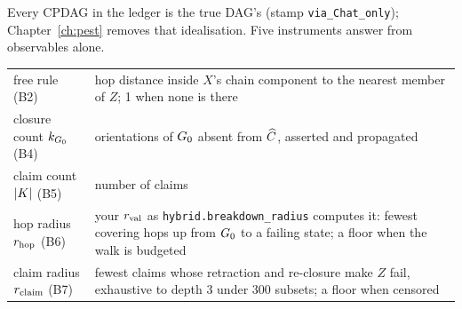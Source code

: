 Every CPDAG in the ledger is the true DAG's (stamp \texttt{via\_Chat\_only}); Chapter~\ref{ch:pest}
removes that idealisation. Five instruments answer from observables alone.

\begin{center}\small
\begin{tabular}{@{}p{3.75cm}p{11.75cm}@{}}
\toprule
free rule (B2) & hop distance inside $X$'s chain component to the nearest member of $Z$; 1 when none
is there \\
closure count $k_{G_0}$ (B4) & orientations of $G_0$ absent from $\widehat{C}$, asserted and propagated \\
claim count $|K|$ (B5) & number of claims \\
hop radius $r_{\mathrm{hop}}$ (B6) & your $r_{\mathrm{val}}$ as \texttt{hybrid.breakdown\_radius} computes it: fewest covering
hops up from $G_0$ to a failing state; a floor when the walk is budgeted \\
claim radius $r_{\mathrm{claim}}$ (B7) & fewest claims whose retraction and re-closure make $Z$ fail, exhaustive to
depth 3 under 300 subsets; a floor when censored \\
\bottomrule
\end{tabular}
\end{center}

